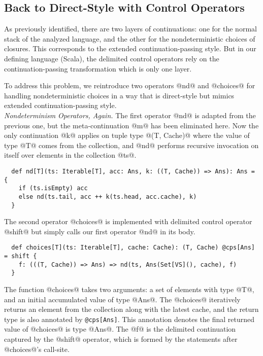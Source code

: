 \documentclass[acmsmall, review]{acmart}\settopmatter{}
\begin{document}
\subsection{Back to Direct-Style with Control Operators} \label{uncps}

As previously identified, there are two layers of continuations: one for the normal stack 
of the analyzed language, and the other for the nondeterministic choices of closures.
This corresponds to the extended continuation-passing style.
But in our defining language (Scala), the delimited control operators rely on the continuation-passing 
transformation which is only one layer.

To address this problem, we reintroduce two operators @nd@ and @choices@ for handling 
nondeterministic choices in a way that is direct-style but mimics extended 
continuation-passing style. \\

\textit{Nondeterminism Operators, Again.}
The first operator @nd@ is adapted from the previous one, but the meta-continuation
@m@ has been eliminated here. Now the only continuation @k@ applies on tuple type @(T, Cache)@ 
where the value of type @T@ comes from the collection, and @nd@ performs recursive invocation
on itself over elements in the collection @ts@. 

\begin{lstlisting}
  def nd[T](ts: Iterable[T], acc: Ans, k: ((T, Cache)) => Ans): Ans = {
    if (ts.isEmpty) acc
    else nd(ts.tail, acc ++ k(ts.head, acc.cache), k)
  }
\end{lstlisting}

The second operator @choices@ is implemented with delimited control operator 
@shift@ but simply calls our first operator @nd@ in its body.

\begin{lstlisting}
  def choices[T](ts: Iterable[T], cache: Cache): (T, Cache) @cps[Ans] = shift {
    f: (((T, Cache)) => Ans) => nd(ts, Ans(Set[VS](), cache), f)
  }
\end{lstlisting}

The function @choices@ takes two arguments: a set of elements with type @T@, 
and an initial accumulated value of type @Ans@.
The @choices@ iteratively returns an element from the collection along with the 
latest cache, and the return type is also annotated by \verb|@cps[Ans]|. 
This annotation denotes the final returned value of @choices@ is type @Ans@.
The @f@ is the delimited continuation captured by the @shift@ operator, which
is formed by the statements after @choices@'s call-site.
\end{document}
